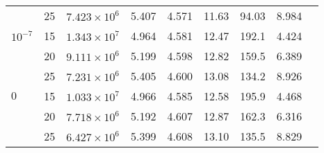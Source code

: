 \begin{table}[h!]
{\begin{tabular}{lcccccccc}
          & 25 & $7.423 \times 10^6$  & 5.407 & 4.571 & 11.63 & 94.03 & 8.984  \\
	$10^{-7}$ & 15 & $1.343 \times 10^7$  & 4.964 & 4.581 & 12.47 & 192.1 & 4.424  \\
          & 20 & $9.111 \times 10^6$  & 5.199 & 4.598 & 12.82 & 159.5 & 6.389  \\
          & 25 & $7.231 \times 10^6$  & 5.405 & 4.600 & 13.08 & 134.2 & 8.926  \\
	$0$       & 15 & $1.033 \times 10^7$  & 4.966 & 4.585 & 12.58 & 195.9 & 4.468  \\
          & 20 & $7.718 \times 10^6$  & 5.192 & 4.607 & 12.87 & 162.3 & 6.316  \\
          & 25 & $6.427 \times 10^6$  & 5.399 & 4.608 & 13.10 & 135.5 & 8.829  \\
         \bottomrule    
        \end{tabular}}
    \label{tab:HIEVMZ}
\end{table}

